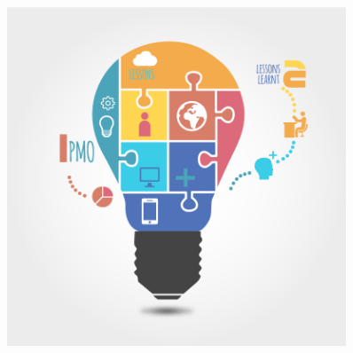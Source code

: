 \documentclass[final]{beamer}
\newlength{\sepwid}
\newlength{\onecolwid}
\newlength{\twocolwid}
\begin{document}
\begin{frame}
\begin{columns}[t]
\begin{column}{\twocolwid}
\begin{columns}[t,totalwidth=\twocolwid]
\begin{column}{\onecolwid}
\begin{figure}
\includegraphics[width=0.8\linewidth]{lessons-learnt.png}
\end{figure}




\end{column} %
\begin{column}{\sepwid}\end{column} %

\begin{column}{\onecolwid}\vspace{-.74in} %



\end{column}
\end{columns}
\end{column}
\end{columns}
\end{frame}
\end{document}
